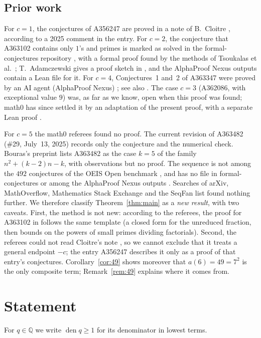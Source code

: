 \documentclass[11pt]{amsart}
\theoremstyle{plain}
\theoremstyle{definition}
\newcommand{\Q}{\mathbb{Q}}
\DeclareMathOperator{\den}{den}
\begin{document}
\subsection*{Prior work}
For $c=1$, the conjectures of A356247 are proved in a note of B.~Cloitre \cite{Cloitre}, according to a 2025 comment in the entry.
For $c=2$, the conjecture that A363102 contains only $1$'s and primes is marked as solved in the formal-conjectures repository \cite{FC}, with a formal proof found by the methods of Tsoukalas et al.\ \cite{Tsoukalas}; T.~Adamczewski gives a proof sketch in \cite[Appendix~A]{Ad}, and the AlphaProof Nexus outputs \cite{APN} contain a Lean file for it.
For $c=4$, Conjectures~1 and~2 of A363347 were proved by an AI agent (AlphaProof Nexus) \cite{APN}; see also \cite[Appendix~A]{Ad}.
The case $c=3$ (A362086, with exceptional value $9$) was, as far as we know, open when this proof was found; math0 has since settled it by an adaptation of the present proof, with a separate Lean proof \cite{M0A362086}.

For $c=5$ the math0 referees found no proof. The current revision of A363482 (\#29, July~13, 2025) records only the conjecture and the numerical check. Bouras's preprint \cite{Barxiv} lists A363482 as the case $k=5$ of the family $n^2+(k-2)n-k$, with observations but no proof. The sequence is not among the $492$ conjectures of the OEIS Open benchmark \cite{Ad}, and has no file in formal-conjectures \cite{FC} or among the AlphaProof Nexus outputs \cite{APN}. Searches of arXiv, MathOverflow, Mathematics Stack Exchange and the SeqFan list found nothing further.
We therefore classify Theorem~\ref{thm:main} as a \emph{new result}, with two caveats. First, the method is not new: according to the referees, the proof for A363102 in \cite[Appendix~A]{Ad} follows the same template (a closed form for the unreduced fraction, then bounds on the powers of small primes dividing factorials). Second, the referees could not read Cloitre's note \cite{Cloitre}, so we cannot exclude that it treats a general endpoint $-c$; the entry A356247 describes it only as a proof of that entry's conjectures.
Corollary~\ref{cor:49} shows moreover that $a(6)=49=7^2$ is the only composite term; Remark~\ref{rem:49} explains where it comes from.

\section{Statement}\label{sec:statement}

For $q\in\Q$ we write $\den q\ge1$ for its denominator in lowest terms.
\end{document}
